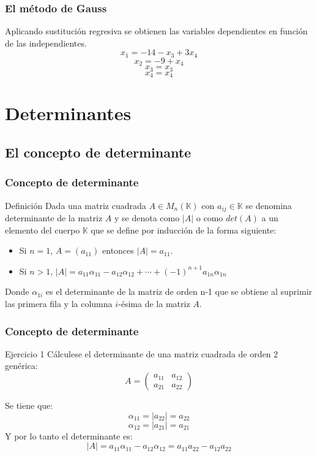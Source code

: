 \documentclass[12pt]{article}
\begin{document}
                     \begin{frame}
    \frametitle{El m\'etodo de Gauss}
Aplicando sustituci\'on regresiva se obtienen las variables dependientes en funci\'on de las independientes.
\[x_1 = -14-x_3+3x_4\]
\[ x_2 = -9+x_4\]
\[ x_3 = x_3\]
\[ x_4 = x_4\]
  \end{frame} 
  
  
  
  \section{Determinantes}
  \subsection{El concepto de determinante}
  
       \begin{frame}
  \frametitle{Concepto de determinante}
   \begin{block}{Definici\'on}
Dada una matriz cuadrada $A\in M_n(\mathbb{K})$ con $a_{ij}\in \mathbb{K}$ se denomina determinante de la matriz $A$ y se denota como $|A|$ o como $det(A)$ a un elemento del cuerpo $\mathbb{K}$ que se define por inducci\'on de la forma siguiente:
\begin{itemize}
\item Si $n=1$, $A=(a_{11})$ entonces $|A| = a_{11}$.
\item Si $n>1$, $|A| = a_{11}\alpha_{11}-a_{12}\alpha_{12}+\cdots+(-1)^{n+1}a_{1n}\alpha_{1n}$ 
\end{itemize} 
Donde $\alpha_{1i}$ es el determinante de la matriz de orden n-1 que se obtiene al suprimir las primera fila y la columna $i$-\'esima de la matriz $A$.
\end{block}
  \end{frame} 
  
  
       \begin{frame}
  \frametitle{Concepto de determinante}
   \begin{block}{Ejercicio 1}
C\'alculese el determinante de una matriz cuadrada de orden 2 gen\'erica:
\[A=  \left(\begin{array}{cc}a_{11}&a_{12} \\a_{21}&a_{22} \end{array}\right) \]
\end{block}
Se tiene que:
\[\alpha_{11} = |a_{22}| = a_{22}\]
\[\alpha_{12} = |a_{21}| = a_{21}\]
Y por lo tanto el determinante es:
\[|A| = a_{11}\alpha_{11}-a_{12}\alpha_{12} = a_{11}a_{22}-a_{12}a_{22}\]
  \end{frame} 
  
\end{document}
